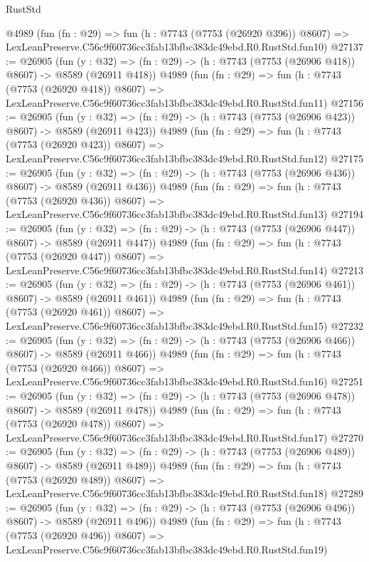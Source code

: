 \begin{lexlean}{RustStd}
\begin{coremodule}
    @4989
    (fun (fn : @29) =>
    fun (h : @7743 (@7753 (@26920 @396)) @8607) =>
    LexLeanPreserve.C56c9f60736cc3fab13bfbc383dc49ebd.R0.RustStd.fun10)
@27137 := @26905
    (fun (y : @32) => (fn : @29) -> (h : @7743 (@7753 (@26906 @418)) @8607) -> @8589 (@26911 @418))
    @4989
    (fun (fn : @29) =>
    fun (h : @7743 (@7753 (@26920 @418)) @8607) =>
    LexLeanPreserve.C56c9f60736cc3fab13bfbc383dc49ebd.R0.RustStd.fun11)
@27156 := @26905
    (fun (y : @32) => (fn : @29) -> (h : @7743 (@7753 (@26906 @423)) @8607) -> @8589 (@26911 @423))
    @4989
    (fun (fn : @29) =>
    fun (h : @7743 (@7753 (@26920 @423)) @8607) =>
    LexLeanPreserve.C56c9f60736cc3fab13bfbc383dc49ebd.R0.RustStd.fun12)
@27175 := @26905
    (fun (y : @32) => (fn : @29) -> (h : @7743 (@7753 (@26906 @436)) @8607) -> @8589 (@26911 @436))
    @4989
    (fun (fn : @29) =>
    fun (h : @7743 (@7753 (@26920 @436)) @8607) =>
    LexLeanPreserve.C56c9f60736cc3fab13bfbc383dc49ebd.R0.RustStd.fun13)
@27194 := @26905
    (fun (y : @32) => (fn : @29) -> (h : @7743 (@7753 (@26906 @447)) @8607) -> @8589 (@26911 @447))
    @4989
    (fun (fn : @29) =>
    fun (h : @7743 (@7753 (@26920 @447)) @8607) =>
    LexLeanPreserve.C56c9f60736cc3fab13bfbc383dc49ebd.R0.RustStd.fun14)
@27213 := @26905
    (fun (y : @32) => (fn : @29) -> (h : @7743 (@7753 (@26906 @461)) @8607) -> @8589 (@26911 @461))
    @4989
    (fun (fn : @29) =>
    fun (h : @7743 (@7753 (@26920 @461)) @8607) =>
    LexLeanPreserve.C56c9f60736cc3fab13bfbc383dc49ebd.R0.RustStd.fun15)
@27232 := @26905
    (fun (y : @32) => (fn : @29) -> (h : @7743 (@7753 (@26906 @466)) @8607) -> @8589 (@26911 @466))
    @4989
    (fun (fn : @29) =>
    fun (h : @7743 (@7753 (@26920 @466)) @8607) =>
    LexLeanPreserve.C56c9f60736cc3fab13bfbc383dc49ebd.R0.RustStd.fun16)
@27251 := @26905
    (fun (y : @32) => (fn : @29) -> (h : @7743 (@7753 (@26906 @478)) @8607) -> @8589 (@26911 @478))
    @4989
    (fun (fn : @29) =>
    fun (h : @7743 (@7753 (@26920 @478)) @8607) =>
    LexLeanPreserve.C56c9f60736cc3fab13bfbc383dc49ebd.R0.RustStd.fun17)
@27270 := @26905
    (fun (y : @32) => (fn : @29) -> (h : @7743 (@7753 (@26906 @489)) @8607) -> @8589 (@26911 @489))
    @4989
    (fun (fn : @29) =>
    fun (h : @7743 (@7753 (@26920 @489)) @8607) =>
    LexLeanPreserve.C56c9f60736cc3fab13bfbc383dc49ebd.R0.RustStd.fun18)
@27289 := @26905
    (fun (y : @32) => (fn : @29) -> (h : @7743 (@7753 (@26906 @496)) @8607) -> @8589 (@26911 @496))
    @4989
    (fun (fn : @29) =>
    fun (h : @7743 (@7753 (@26920 @496)) @8607) =>
    LexLeanPreserve.C56c9f60736cc3fab13bfbc383dc49ebd.R0.RustStd.fun19)

\end{coremodule}
\end{lexlean}
